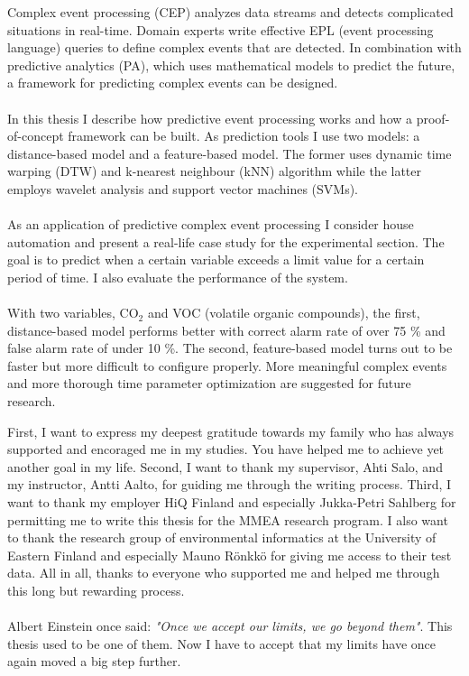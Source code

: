 \documentclass[english,12pt,a4paper,pdftex]{report}
\begin{document}
\newpage

\begin{abstractpage}[english]
Complex event processing (CEP) analyzes data streams and detects complicated situations in real-time. Domain experts write effective EPL (event processing language) queries to define complex events that are detected. In combination with predictive analytics (PA), which uses mathematical models to predict the future, a framework for predicting complex events can be designed.
\\
\\
In this thesis I describe how predictive event processing works and how a proof-of-concept framework can be built. As prediction tools I use two models: a distance-based model and a feature-based model. The former uses dynamic time warping (DTW) and k-nearest neighbour (kNN) algorithm while the latter employs wavelet analysis and support vector machines (SVMs).
\\
\\
As an application of predictive complex event processing I consider house automation and present a real-life case study for the experimental section. The goal is to predict when a certain variable exceeds a limit value for a certain period of time. I also evaluate the performance of the system.
\\
\\
With two variables, $\mathrm{CO}_2$ and VOC (volatile organic compounds), the first, distance-based model performs better with correct alarm rate of over 75 \% and false alarm rate of under 10 \%. The second, feature-based model turns out to be faster but more difficult to configure properly. More meaningful complex events and more thorough time parameter optimization are suggested for future research.





\end{abstractpage}

First, I want to express my deepest gratitude towards my family who has always supported and encoraged me in my studies. You have helped me to achieve yet another goal in my life. Second, I want to thank my supervisor, Ahti Salo, and my instructor, Antti Aalto, for guiding me through the writing process. Third, I want to thank my employer HiQ Finland and especially Jukka-Petri Sahlberg for permitting me to write this thesis for the MMEA research program. I also want to thank the research group of environmental informatics at the University of Eastern Finland and especially Mauno R\"onkk\"o for giving me access to their test data. All in all, thanks to everyone who supported me and helped me through this long but rewarding process.
\\
\\
Albert Einstein once said: \emph{"Once we accept our limits, we go beyond them"}. This thesis used to be one of them. Now I have to accept that my limits have once again moved a big step further.
\end{document}
